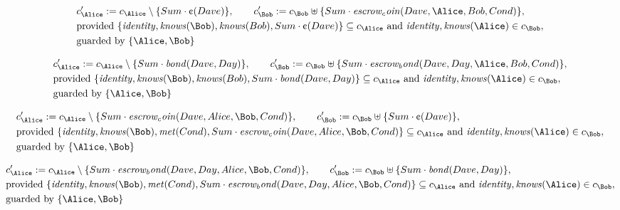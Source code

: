 \begin{align*}
&
c'_
{
\Alice
}
 := 
c_
{
\Alice
}
 \setminus 
\{
Sum
\cdot
\text{\textcent}
(
Dave
)
\}
, \qquad 
c'_
{
\Bob
}
 := 
c_
{
\Bob
}
 \uplus 
\{
Sum
\cdot
\mathit{
escrow_coin
}
(
Dave
,
\Alice
,
Bob
,
Cond
)
\}
,\\
&
\text{provided } 
\{
\mathit{
identity
}
,
\mathit{
knows
}
(
\Bob
)
,
\mathit{
knows
}
(
Bob
)
,
Sum
\cdot
\text{\textcent}
(
Dave
)
\}
 \subseteq c_
{
\Alice
}
 \text{ and } 
\mathit{
identity
}
,
\mathit{
knows
}
(
\Alice
)
 \in c_
{
\Bob
}
,\\
&
\text{guarded by } \{
\Alice
,
\Bob
\}
\end{align*}

\begin{align*}
&
c'_
{
\Alice
}
 := 
c_
{
\Alice
}
 \setminus 
\{
Sum
\cdot
\mathit{
bond
}
(
Dave
,
Day
)
\}
, \qquad 
c'_
{
\Bob
}
 := 
c_
{
\Bob
}
 \uplus 
\{
Sum
\cdot
\mathit{
escrow_bond
}
(
Dave
,
Day
,
\Alice
,
Bob
,
Cond
)
\}
,\\
&
\text{provided } 
\{
\mathit{
identity
}
,
\mathit{
knows
}
(
\Bob
)
,
\mathit{
knows
}
(
Bob
)
,
Sum
\cdot
\mathit{
bond
}
(
Dave
,
Day
)
\}
 \subseteq c_
{
\Alice
}
 \text{ and } 
\mathit{
identity
}
,
\mathit{
knows
}
(
\Alice
)
 \in c_
{
\Bob
}
,\\
&
\text{guarded by } \{
\Alice
,
\Bob
\}
\end{align*}

\begin{align*}
&
c'_
{
\Alice
}
 := 
c_
{
\Alice
}
 \setminus 
\{
Sum
\cdot
\mathit{
escrow_coin
}
(
Dave
,
Alice
,
\Bob
,
Cond
)
\}
, \qquad 
c'_
{
\Bob
}
 := 
c_
{
\Bob
}
 \uplus 
\{
Sum
\cdot
\text{\textcent}
(
Dave
)
\}
,\\
&
\text{provided } 
\{
\mathit{
identity
}
,
\mathit{
knows
}
(
\Bob
)
,
\mathit{
met
}
(
Cond
)
,
Sum
\cdot
\mathit{
escrow_coin
}
(
Dave
,
Alice
,
\Bob
,
Cond
)
\}
 \subseteq c_
{
\Alice
}
 \text{ and } 
\mathit{
identity
}
,
\mathit{
knows
}
(
\Alice
)
 \in c_
{
\Bob
}
,\\
&
\text{guarded by } \{
\Alice
,
\Bob
\}
\end{align*}

\begin{align*}
&
c'_
{
\Alice
}
 := 
c_
{
\Alice
}
 \setminus 
\{
Sum
\cdot
\mathit{
escrow_bond
}
(
Dave
,
Day
,
Alice
,
\Bob
,
Cond
)
\}
, \qquad 
c'_
{
\Bob
}
 := 
c_
{
\Bob
}
 \uplus 
\{
Sum
\cdot
\mathit{
bond
}
(
Dave
,
Day
)
\}
,\\
&
\text{provided } 
\{
\mathit{
identity
}
,
\mathit{
knows
}
(
\Bob
)
,
\mathit{
met
}
(
Cond
)
,
Sum
\cdot
\mathit{
escrow_bond
}
(
Dave
,
Day
,
Alice
,
\Bob
,
Cond
)
\}
 \subseteq c_
{
\Alice
}
 \text{ and } 
\mathit{
identity
}
,
\mathit{
knows
}
(
\Alice
)
 \in c_
{
\Bob
}
,\\
&
\text{guarded by } \{
\Alice
,
\Bob
\}
\end{align*}
